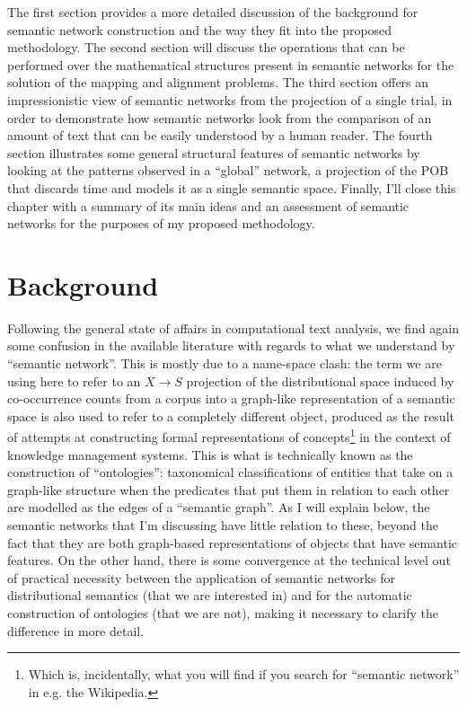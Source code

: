 The first section provides a more detailed discussion of the background for semantic network construction and the way they fit into the proposed methodology.
The second section will discuss the operations that can be performed over the mathematical structures present in semantic networks for the solution of the mapping and alignment problems.
The third section offers an impressionistic view of semantic networks from the projection of a single trial, in order to demonstrate how semantic networks look from the comparison of an amount of text that can be easily understood by a human reader.
The fourth section illustrates some general structural features of semantic networks by looking at the patterns observed in a ``global'' network, a projection of the POB that discards time and models it as a single semantic space.
Finally, I'll close this chapter with a summary of its main ideas and an assessment of semantic networks for the purposes of my proposed methodology.

\section{Background}
\label{sec:concept_maps}

Following the general state of affairs in computational text analysis, we find again some confusion in the available literature with regards to what we understand by ``semantic network''.
This is mostly due to a name-space clash: the term we are using here to refer to an $X \rightarrow S$ projection of the distributional space induced by co-occurrence counts from a corpus into a graph-like representation of a semantic space is also used to refer to a completely different object, produced as the result of attempts at constructing formal representations of concepts\footnote{
    Which is, incidentally, what you will find if you search for ``semantic network'' in e.g. the Wikipedia.
} in the context of knowledge management systems.
This is what is technically known as the construction of ``ontologies'': taxonomical classifications of entities that take on a graph-like structure when the predicates that put them in relation to each other are modelled as the edges of a ``semantic graph''.
As I will explain below, the semantic networks that I'm discussing have little relation to these, beyond the fact that they are both graph-based representations of objects that have semantic features.
On the other hand, there is some convergence at the technical level out of practical necessity between the application of semantic networks for distributional semantics (that we are interested in) and for the automatic construction of ontologies (that we are not), making it necessary to clarify the difference in more detail.

